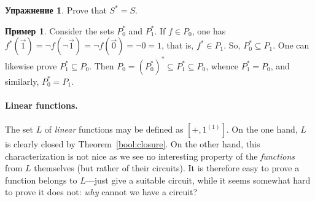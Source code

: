\documentclass[12pt,notitlepage]{article}
\theoremstyle{plain}
\theoremstyle{definition}
\newtheorem{exc}[thm]{Упражнение}
\newtheorem{exm}[thm]{Пример}
\theoremstyle{plain}
\newcommand{\sbs}{\subseteq}
\newcommand{\1}{\mathbf{1}}
\newcommand{\0}{\mathbf{0}}
\begin{document}
\begin{exc}
	Prove that $S^* = S$.
\end{exc}
\begin{exm}\label{bool:const_dual}
	Consider the sets $P^*_0$ and $P^*_1$. If $f \in P_0$, one has $f^*(\vec 1) = \neg f (\neg \vec 1) = \neg f (\vec 0) = \neg 0 = 1$, that is, $f^* \in P_1$. So, $P^*_0 \sbs P_1$. One can likewise prove $P^*_1 \sbs P_0$. Then $P_0 = (P^*_0)^* \sbs P^*_1 \sbs P_0$, whence $P^*_1 = P_0$, and similarly, $P^*_0 = P_1$.
\end{exm}

\paragraph{Linear functions.}
The set $L$ of \emph{linear} functions may be defined as $[{+}, 1^{(1)}]$. On the one hand, $L$  is clearly closed by Theorem~\ref{bool:closure}. On the other hand, this characterization is not nice as we see no interesting property of the \emph{functions} from $L$ themselves (but rather of their circuits). It is therefore easy to prove a function belongs to $L$---just give a suitable circuit, while it seems somewhat hard to prove it does not: \emph{why} cannot we have a circuit?
\end{document}
